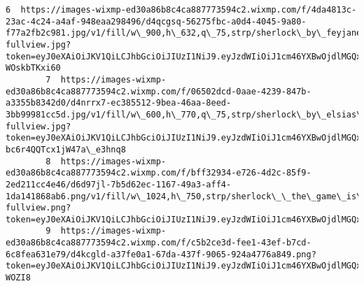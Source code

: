 \documentclass[11pt]{article}
\begin{document}
\begin{Verbatim}[commandchars=\\\{\}]
        6  https://images-wixmp-ed30a86b8c4ca887773594c2.wixmp.com/f/4da4813c-23ac-4c24-a4af-948eaa298496/d4qcgsq-56275fbc-a0d4-4045-9a80-f77a2fb2c981.jpg/v1/fill/w\_900,h\_632,q\_75,strp/sherlock\_by\_feyjane\_d4qcgsq-fullview.jpg?token=eyJ0eXAiOiJKV1QiLCJhbGciOiJIUzI1NiJ9.eyJzdWIiOiJ1cm46YXBwOjdlMGQxODg5ODIyNjQzNzNhNWYwZDQxNWVhMGQyNmUwIiwiaXNzIjoidXJuOmFwcDo3ZTBkMTg4OTgyMjY0MzczYTVmMGQ0MTVlYTBkMjZlMCIsIm9iaiI6W1t7ImhlaWdodCI6Ijw9NjMyIiwicGF0aCI6IlwvZlwvNGRhNDgxM2MtMjNhYy00YzI0LWE0YWYtOTQ4ZWFhMjk4NDk2XC9kNHFjZ3NxLTU2Mjc1ZmJjLWEwZDQtNDA0NS05YTgwLWY3N2EyZmIyYzk4MS5qcGciLCJ3aWR0aCI6Ijw9OTAwIn1dXSwiYXVkIjpbInVybjpzZXJ2aWNlOmltYWdlLm9wZXJhdGlvbnMiXX0.NKBehw9Lh1lYIHt8tTQ\_jG08rgbSBEZ-WOskbTKxi60                                            
        7  https://images-wixmp-ed30a86b8c4ca887773594c2.wixmp.com/f/06502dcd-0aae-4239-847b-a3355b8342d0/d4nrrx7-ec385512-9bea-46aa-8eed-3bb99981cc5d.jpg/v1/fill/w\_600,h\_770,q\_75,strp/sherlock\_by\_elsias\_d4nrrx7-fullview.jpg?token=eyJ0eXAiOiJKV1QiLCJhbGciOiJIUzI1NiJ9.eyJzdWIiOiJ1cm46YXBwOjdlMGQxODg5ODIyNjQzNzNhNWYwZDQxNWVhMGQyNmUwIiwiaXNzIjoidXJuOmFwcDo3ZTBkMTg4OTgyMjY0MzczYTVmMGQ0MTVlYTBkMjZlMCIsIm9iaiI6W1t7ImhlaWdodCI6Ijw9NzcwIiwicGF0aCI6IlwvZlwvMDY1MDJkY2QtMGFhZS00MjM5LTg0N2ItYTMzNTViODM0MmQwXC9kNG5ycng3LWVjMzg1NTEyLTliZWEtNDZhYS04ZWVkLTNiYjk5OTgxY2M1ZC5qcGciLCJ3aWR0aCI6Ijw9NjAwIn1dXSwiYXVkIjpbInVybjpzZXJ2aWNlOmltYWdlLm9wZXJhdGlvbnMiXX0.MFrdMPlD0MCVREsbhl0-bc6r4QQTcx1jW47a\_e3hnq8                                             
        8  https://images-wixmp-ed30a86b8c4ca887773594c2.wixmp.com/f/bff32934-e726-4d2c-85f9-2ed211cc4e46/d6d97jl-7b5d62ec-1167-49a3-aff4-1da141868ab6.png/v1/fill/w\_1024,h\_750,strp/sherlock\_\_the\_game\_is\_on\_\_character\_contest\_\_by\_sherlockthegame\_d6d97jl-fullview.png?token=eyJ0eXAiOiJKV1QiLCJhbGciOiJIUzI1NiJ9.eyJzdWIiOiJ1cm46YXBwOjdlMGQxODg5ODIyNjQzNzNhNWYwZDQxNWVhMGQyNmUwIiwiaXNzIjoidXJuOmFwcDo3ZTBkMTg4OTgyMjY0MzczYTVmMGQ0MTVlYTBkMjZlMCIsIm9iaiI6W1t7ImhlaWdodCI6Ijw9NzUwIiwicGF0aCI6IlwvZlwvYmZmMzI5MzQtZTcyNi00ZDJjLTg1ZjktMmVkMjExY2M0ZTQ2XC9kNmQ5N2psLTdiNWQ2MmVjLTExNjctNDlhMy1hZmY0LTFkYTE0MTg2OGFiNi5wbmciLCJ3aWR0aCI6Ijw9MTAyNCJ9XV0sImF1ZCI6WyJ1cm46c2VydmljZTppbWFnZS5vcGVyYXRpb25zIl19.8FJFQbkoZhTxoISgGnPk7nl7lDh3lTbB5JU0qlZSD5c   
        9  https://images-wixmp-ed30a86b8c4ca887773594c2.wixmp.com/f/c5b2ce3d-fee1-43ef-b7cd-6c8fea631e79/d4kcgld-a37fe0a1-67da-437f-9065-924a4776a849.png?token=eyJ0eXAiOiJKV1QiLCJhbGciOiJIUzI1NiJ9.eyJzdWIiOiJ1cm46YXBwOjdlMGQxODg5ODIyNjQzNzNhNWYwZDQxNWVhMGQyNmUwIiwiaXNzIjoidXJuOmFwcDo3ZTBkMTg4OTgyMjY0MzczYTVmMGQ0MTVlYTBkMjZlMCIsIm9iaiI6W1t7InBhdGgiOiJcL2ZcL2M1YjJjZTNkLWZlZTEtNDNlZi1iN2NkLTZjOGZlYTYzMWU3OVwvZDRrY2dsZC1hMzdmZTBhMS02N2RhLTQzN2YtOTA2NS05MjRhNDc3NmE4NDkucG5nIn1dXSwiYXVkIjpbInVybjpzZXJ2aWNlOmZpbGUuZG93bmxvYWQiXX0.eqBpfLqmpgdZvMgTw11YDY6ul6pJZmsFWbydy-WOZI8                                                                                                                                                                   
        

\end{Verbatim}
\end{document}
